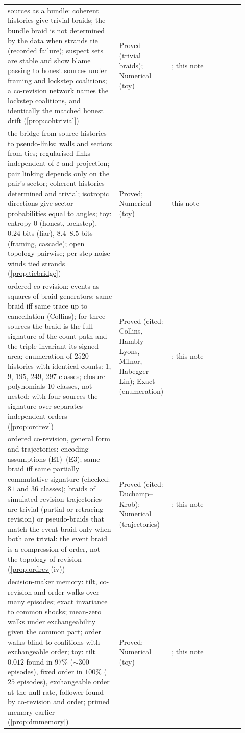 \documentclass[11pt]{article}
\theoremstyle{definition}\newtheorem{definition}[theorem]{Definition}\newtheorem{remark}[theorem]{Remark}\newtheorem{example}[theorem]{Example}\newtheorem{problem}[theorem]{Open problem}\crefname{problem}{Problem}{Problems}
\begin{document}
{\begin{longtable}{p{0.46\linewidth}p{0.16\linewidth}p{0.3\linewidth}}
\rowcolor{stNew} sources as a bundle: coherent histories give trivial braids; the bundle braid is not determined by the data when strands tie (recorded failure); suspect sets are stable and show blame passing to honest sources under framing and lockstep coalitions; a co-revision network names the lockstep coalitions, and identically the matched honest drift (\cref{prop:cohtrivial}) & Proved (trivial braids); Numerical (toy) & \cite{AbramskyCaru2019,Iannucci2025}; this note\\
\rowcolor{stNew} the bridge from source histories to pseudo-links: walls and sectors from ties; regularised links independent of $\varepsilon$ and projection; pair linking depends only on the pair's sector; coherent histories determined and trivial; isotropic directions give sector probabilities equal to angles; toy: entropy $0$ (honest, lockstep), $0.24$ bits (liar), $8.4$--$8.5$ bits (framing, cascade); open topology pairwise; per-step noise winds tied strands (\cref{prop:tiebridge}) & Proved; Numerical (toy) & this note\\
\rowcolor{stNew} ordered co-revision: events as squares of braid generators; same braid iff same trace up to cancellation (Collins); for three sources the braid is the full signature of the count path and the triple invariant its signed area; enumeration of $2520$ histories with identical counts: $1$, $9$, $195$, $249$, $297$ classes; closure polynomials $10$ classes, not nested; with four sources the signature over-separates independent orders (\cref{prop:ordrev}) & Proved (cited: Collins, Hambly--Lyons, Milnor, Habegger--Lin); Exact (enumeration) & \cite{Collins1994,HamblyLyons2010,CartierFoata1969}; this note\\
\rowcolor{stNew} ordered co-revision, general form and trajectories: encoding assumptions (E1)--(E3); same braid iff same partially commutative signature (checked: $81$ and $36$ classes); braids of simulated revision trajectories are trivial (partial or retracing revision) or pseudo-braids that match the event braid only when both are trivial: the event braid is a compression of order, not the topology of revision (\cref{prop:ordrev}(iv)) & Proved (cited: Duchamp--Krob); Numerical (trajectories) & \cite{DuchampKrob1992}; this note\\
\rowcolor{stNew} decision-maker memory: tilt, co-revision and order walks over many episodes; exact invariance to common shocks; mean-zero walks under exchangeability given the common part; order walks blind to coalitions with exchangeable order; toy: tilt $0.012$ found in $97\%$ ($\sim300$ episodes), fixed order in $100\%$ ($25$ episodes), exchangeable order at the null rate, follower found by co-revision and order; primed memory earlier (\cref{prop:dmmemory}) & Proved; Numerical (toy) & \cite{GohmKostler2009,Nechaev1998}; this note\\

\end{longtable}}
\end{document}

